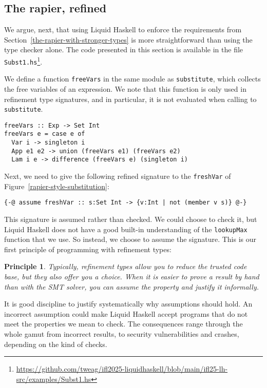\documentclass[sigconf, review]{acmart}
\newcommand{\tc}[1]{{\small\texttt{#1}}}
\newcommand{\sourcefile}[1]{\tc{#1}\footnote{\scriptsize\url{https://github.com/tweag/ifl2025-liquidhaskell/blob/main/ifl25-lh-src/examples/#1}}}
\newtheorem{principle}{Principle}
\begin{document}
\subsection{The rapier, refined}
\label{the-rapier-with-refinement-types}

We argue, next, that using Liquid Haskell to enforce the
requirements from Section~\ref{the-rapier-with-stronger-types} is more
straightforward than using the type checker alone. The code presented in this section is available in the file
\sourcefile{Subst1.hs}.

We define a function \tc{freeVars} in the same module as \tc{subs\-ti\-tute},
which collects the free variables of an expression. We note that this function
is only used in refinement type signatures, and in particular, it is not evaluated
when calling to \tc{substitute}.

\begin{verbatim}
freeVars :: Exp -> Set Int
freeVars e = case e of
  Var i -> singleton i
  App e1 e2 -> union (freeVars e1) (freeVars e2)
  Lam i e -> difference (freeVars e) (singleton i)
\end{verbatim}

Next, we need to give the following refined signature to the \tc{freshVar} of
Figure~\ref{rapier-style-substitution}:
\begin{verbatim}
{-@ assume freshVar :: s:Set Int -> {v:Int | not (member v s)} @-}
\end{verbatim}
This signature is assumed rather than checked. We could choose to check it, but
Liquid Haskell does not have a good built-in understanding of the \tc{lookupMax}
function that we use. So instead, we choose to assume the signature. This is our
first principle of programming with refinement types:

\begin{principle}
\label{assumption-principle}
  Typically, refinement types allow you to reduce the trusted code base, but they also offer
    you a choice. When it is easier to prove a result by
    hand than with the SMT solver, you can assume the property and
    justify it informally.
\end{principle}

It is good discipline to justify systematically why assumptions should hold.
An incorrect assumption could make Liquid Haskell accept programs that do not
meet the properties we mean to check. The consequences range through the whole
gamut from incorrect results, to security vulnerabilities and crashes, depending
on the kind of checks.
\end{document}
